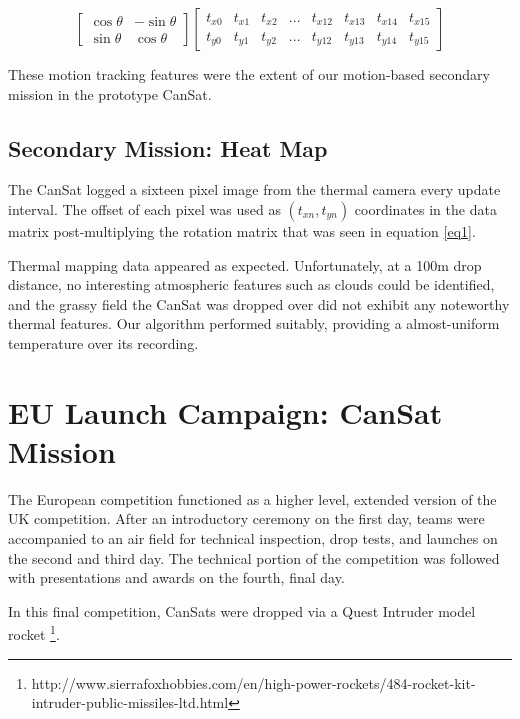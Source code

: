 \documentclass[]{report}
\begin{document}
	\begin{center}
	\begin{equation} \label{eq1}	
	\begin{bmatrix}
	\cos\theta & -\sin\theta \\
	\sin\theta & \cos\theta
	\end{bmatrix}	
	\begin{bmatrix}
	t_{x0} & t_{x1} & t_{x2} & . . . & t_{x12} & t_{x13} & t_{x14} & t_{x15} \\
	t_{y0} & t_{y1} & t_{y2} & . . . & t_{y12} & t_{y13} & t_{y14} & t_{y15}
	\end{bmatrix}
	\end{equation}
	\end{center}

	These motion tracking features were the extent of our motion-based secondary mission in the prototype CanSat. 
	
	\subsection{Secondary Mission: Heat Map}
	
	The CanSat logged a sixteen pixel image from the thermal camera every update interval. The offset of each pixel was used as $(t_{xn}, t_{yn})$ coordinates in the data matrix post-multiplying the rotation matrix that was seen in equation \ref{eq1}.
	
	Thermal mapping data appeared as expected. Unfortunately, at a 100m drop distance, no interesting atmospheric features such as clouds could be identified, and the grassy field the CanSat was dropped over did not exhibit any noteworthy thermal features. Our algorithm performed suitably, providing a almost-uniform temperature over its recording.
		
	\section{EU Launch Campaign: CanSat Mission}
	
	The European competition functioned as a higher level, extended version of the UK competition. After an introductory ceremony on the first day, teams were accompanied to an air field for technical inspection, drop tests, and launches on the second and third day. The technical portion of the competition was followed with presentations and awards on the fourth, final day. 
	
	In this final competition, CanSats were dropped via a Quest Intruder model rocket \footnote{http://www.sierrafoxhobbies.com/en/high-power-rockets/484-rocket-kit-intruder-public-missiles-ltd.html}. 
	
\end{document}
